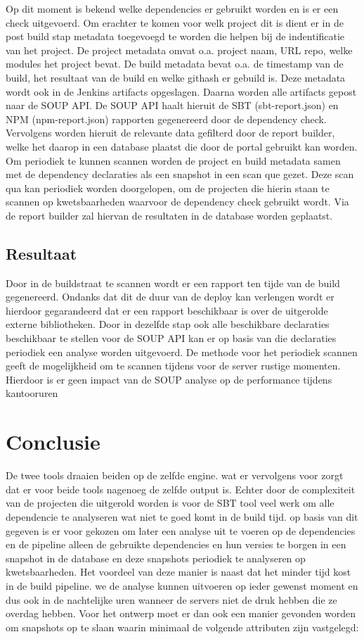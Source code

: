 Op dit moment is bekend welke dependencies er gebruikt worden en is er een check uitgevoerd. Om erachter te komen voor welk project dit is dient er in de post build stap metadata toegevoegd te worden die helpen bij de indentificatie van het project. De project metadata omvat o.a. project naam, URL repo, welke modules het project bevat. De build metadata bevat o.a. de timestamp van de build, het resultaat van de build en welke githash er gebuild is. Deze metadata wordt ook in de Jenkins artifacts opgeslagen. Daarna worden alle artifacts gepost naar de SOUP API.
De SOUP API haalt hieruit de SBT (sbt-report.json) en NPM (npm-report.json) rapporten gegenereerd door de dependency check. Vervolgens worden hieruit de relevante data gefilterd door de report builder, welke het daarop in een database plaatst die door de portal gebruikt kan worden.
Om periodiek te kunnen scannen worden de project en build metadata samen met de dependency declaraties als een snapshot in een scan que gezet. Deze scan qua kan periodiek worden doorgelopen, om de projecten die hierin staan te scannen op kwetsbaarheden waarvoor de dependency check gebruikt wordt. Via de report builder zal hiervan de resultaten in de database worden geplaatst.

\subsection{Resultaat}
Door in de buildstraat te scannen wordt er een rapport ten tijde van de build gegenereerd. Ondanks dat dit de duur van de deploy kan verlengen wordt er hierdoor gegarandeerd dat er een rapport beschikbaar is over de uitgerolde externe bibliotheken. Door in dezelfde stap ook alle beschikbare declaraties beschikbaar te stellen voor de SOUP API kan er op basis van die declaraties periodiek een analyse worden uitgevoerd.
De methode voor het periodiek scannen geeft de mogelijkheid om te scannen tijdens voor de server rustige momenten. Hierdoor is er geen impact van de SOUP analyse op de performance tijdens kantooruren

\section{Conclusie}\label{sec:conclusie}


De twee tools draaien beiden op de zelfde engine. wat er vervolgens voor zorgt dat er voor beide tools nagenoeg de zelfde output is. Echter door de complexiteit van de projecten die uitgerold worden is voor de SBT tool veel werk om alle dependencie te analyseren wat niet te goed komt in de build tijd. op basis van dit gegeven is er voor gekozen om later een analyse uit te voeren op de dependencies en de pipeline alleen de gebruikte dependencies en hun versies te borgen in een snapshot in de database en deze snapshots periodiek te analyseren op kwetsbaarheden. Het voordeel van deze manier is naast dat het minder tijd kost in de build pipeline. we de analyse kunnen uitvoeren op ieder gewenst moment en dus ook in de nachtelijke uren wanneer de servers niet de druk hebben die ze overdag hebben. Voor het ontwerp moet er dan ook een manier gevonden worden om snapshots op te slaan waarin minimaal de volgende attributen zijn vastgelegd:

